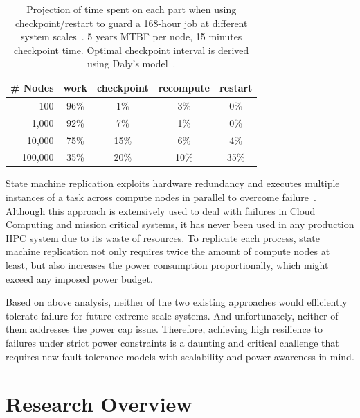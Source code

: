 \begin{table}
\centering
\caption{Projection of time spent on each part when using checkpoint/restart to guard a 168-hour job at different system scales~\cite{fiala_2012_sdc}. 5 years MTBF per node, 15 minutes checkpoint time. Optimal checkpoint interval is derived using Daly's model~\cite{daly_fgcs_2006}. }
\label{tbl:cp_effi}
\begin{tabular}{r c c c c} 
 \hline
 \# Nodes  & work & checkpoint & recompute & restart \\
 \hline\hline
 100 & 96\% & 1\% & 3\% & 0\% \\
1,000 & 92\% & 7\% & 1\% & 0\% \\
10,000 & 75\% & 15\% & 6\% & 4\% \\
100,000 & 35\% & 20\% & 10\% & 35\% \\  
 \hline
\end{tabular}
\end{table}
State machine replication exploits hardware redundancy and executes multiple instances of a task across compute nodes 
in parallel to overcome failure~\cite{bartlett_1981_nonstop,tsai_isads_2011,ferreira_sc_2011}. Although this approach is extensively used 
to deal with failures in 
Cloud Computing and mission critical systems, it has 
never been used in any production HPC system due to its waste of resources. To replicate each process, state machine replication not only requires 
twice the amount of compute nodes at least, but also increases the power consumption proportionally, which might exceed any imposed power budget. 

Based on above analysis, neither of the two existing approaches would efficiently tolerate failure for future extreme-scale systems. And unfortunately, neither 
of them addresses the power cap issue. 
Therefore, achieving high resilience to failures under strict power constraints is a daunting and critical challenge that requires new 
fault tolerance models with scalability and power-awareness in mind. 
 
\section{Research Overview}

